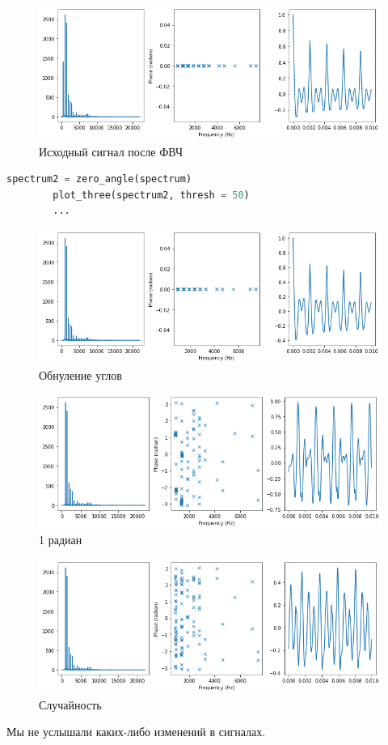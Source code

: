 \documentclass[a4paper, 12pt]{report}
\begin{document}
	\begin{figure}[H]
		\centering
		\includegraphics[width=1.0\textwidth]{test17.png}
		\caption{Исходный сигнал после ФВЧ}
		\label{fig:test17}
	\end{figure}
	\begin{lstlisting}[language=Python,caption=Применение функций сигнала после ФВЧ]
		spectrum2 = zero_angle(spectrum)
		plot_three(spectrum2, thresh = 50)
		...
	\end{lstlisting}
	\begin{figure}[H]
		\centering
		\includegraphics[width=1.0\textwidth]{test18.png}
		\caption{Обнуление углов}
		\label{fig:test18}
	\end{figure}
	\begin{figure}[H]
		\centering
		\includegraphics[width=1.0\textwidth]{test19.png}
		\caption{1 радиан}
		\label{fig:test19}
	\end{figure}
	\begin{figure}[H]
		\centering
		\includegraphics[width=1.0\textwidth]{test20.png}
		\caption{Случайность}
		\label{fig:test20}
	\end{figure}
	Мы не услышали каких-либо изменений в сигналах.
\end{document}
